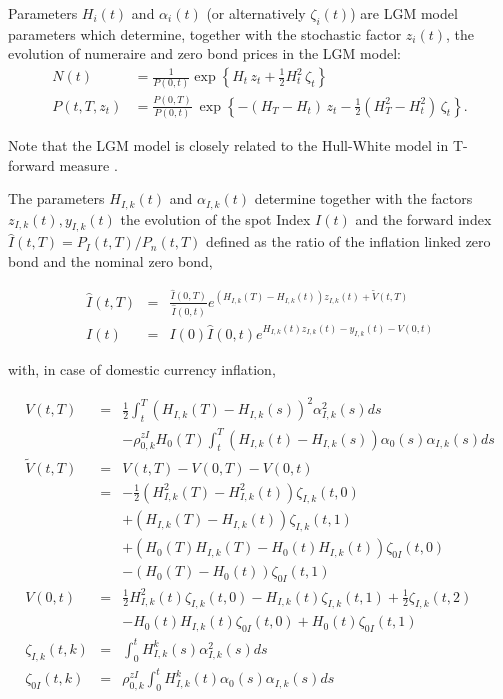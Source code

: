 \documentclass[12pt, a4paper]{article}
\begin{document}
{\begin{appendix}
\medskip Parameters $H_i(t)$ and $\alpha_i(t)$ (or alternatively $\zeta_i(t)$) are LGM model parameters which determine,
together with the stochastic factor $z_i(t)$, the evolution of numeraire and zero bond prices in the LGM model:
\begin{align}
N(t) &= \frac{1}{P(0,t)}\exp\left\{H_t\, z_t + \frac{1}{2}H^2_t\,\zeta_t \right\}
\label{lgm1f_numeraire} \\
P(t,T,z_t)
&= \frac{P(0,T)}{P(0,t)}\:\exp\left\{ -(H_T-H_t)\,z_t - \frac{1}{2} \left(H^2_T-H^2_t\right)\,\zeta_t\right\}.
\label{lgm1f_zerobond}
\end{align}

Note that the LGM model is closely related to the Hull-White model in T-forward measure \cite{Lichters}.

\medskip The parameters $H_{I,k}(t)$ and $\alpha_{I,k}(t)$ determine together with the factors $z_{I,k}(t), y_{I,k}(t)$
the evolution of the spot Index $I(t)$ and the forward index $\hat{I}(t,T) = P_I(t,T) / P_n(t,T)$ defined as the ratio
of the inflation linked zero bond and the nominal zero bond,

\begin{eqnarray*}
  \hat{I}(t,T) &=& \frac{\hat{I}(0,T)}{\hat{I}(0,t)} e^{(H_{I,k}(T)-H_{I,k}(t))z_{I,k}(t)+\tilde{V}(t,T)} \\
  I(t) &=& I(0) \hat{I}(0,t)e^{H_{I,k}(t)z_{I,k}(t)-y_{I,k}(t)-V(0,t)}
\end{eqnarray*}

with, in case of domestic currency inflation,

\begin{eqnarray*}
  V(t,T) &=& \frac{1}{2} \int_t^T (H_{I,k}(T)-H_{I,k}(s))^2 \alpha_{I,k}^2(s) ds \\
         & & - \rho^{zI}_{0,k} H_0(T) \int_t^T (H_{I,k}(t)-H_{I,k}(s))\alpha_0(s)\alpha_{I,k}(s)ds \\
  \tilde{V}(t,T) &=& V(t,T) - V(0,T) -V(0,t) \\
         &=& -\frac{1}{2}(H_{I,k}^2(T)-H_{I,k}^2(t))\zeta_{I,k}(t,0) \\
         & & +(H_{I,k}(T)-H_{I,k}(t)) \zeta_{I,k}(t,1) \\
         & & +(H_0(T)H_{I,k}(T) - H_0(t)H_{I,k}(t))\zeta_{0I}(t,0) \\
         & & -(H_0(T)-H_0(t))\zeta_{0I}(t,1) \\
  V(0,t) &=& \frac{1}{2}H_{I,k}^2(t)\zeta_{I,k}(t,0)-H_{I,k}(t)\zeta_{I,k}(t,1)+\frac{1}{2}\zeta_{I,k}(t,2) \\
         & & -H_0(t)H_{I,k}(t)\zeta_{0I}(t,0)+H_0(t)\zeta_{0I}(t,1) \\
  \zeta_{I,k}(t,k) &=& \int_0^t H_{I,k}^k(s)\alpha_{I,k}^2(s) ds \\
  \zeta_{0I}(t,k) &=& \rho^{zI}_{0,k}\int_0^t H_{I,k}^k(t) \alpha_0(s) \alpha_{I,k}(s) ds
\end{eqnarray*}


\end{appendix}}
\end{document}
